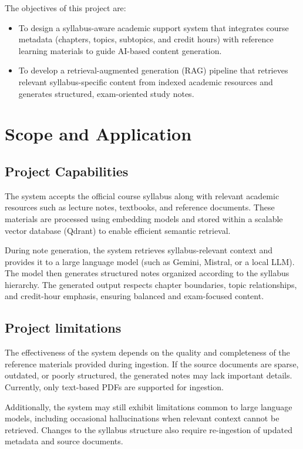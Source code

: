 The objectives of this project are:
\begin{itemize}
    \item To design a syllabus-aware academic support system that integrates course metadata (chapters, topics, subtopics, and credit hours) with reference learning materials to guide AI-based content generation.
    \item To develop a retrieval-augmented generation (RAG) pipeline that retrieves relevant syllabus-specific content from indexed academic resources and generates structured, exam-oriented study notes.
\end{itemize}

\section{Scope and Application}
\subsection{Project Capabilities}
    The system accepts the official course syllabus along with relevant academic resources such as lecture notes, textbooks, and reference documents. These materials are processed using embedding models and stored within a scalable vector database (Qdrant) to enable efficient semantic retrieval. \par
    During note generation, the system retrieves syllabus-relevant context and provides it to a large language model (such as Gemini, Mistral, or a local LLM). The model then generates structured notes organized according to the syllabus hierarchy. The generated output respects chapter boundaries, topic relationships, and credit-hour emphasis, ensuring balanced and exam-focused content. \par

\subsection{Project limitations}
    The effectiveness of the system depends on the quality and completeness of the reference  materials provided during ingestion. If the source documents are sparse, outdated, or poorly structured, the generated notes may lack important details. Currently, only text-based PDFs are supported for ingestion. \par

    Additionally, the system may still exhibit limitations common to large language models, including occasional hallucinations when relevant context cannot be retrieved. Changes to the syllabus structure also require re-ingestion of updated metadata and source documents. \par

